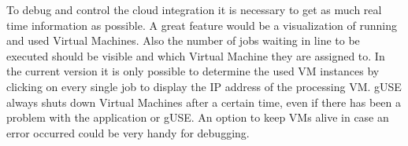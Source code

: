 To debug and control the cloud integration it is necessary to get as much real time information as possible.
A great feature would be a visualization of running and used Virtual Machines.
Also the number of jobs waiting in line to be executed should be visible and which Virtual Machine they are assigned to.
In the current version it is only possible to determine the used VM instances by clicking on every single job to display the IP address of the processing VM.
gUSE always shuts down Virtual Machines after a certain time, even if there has been a problem with the application or gUSE.
An option to keep VMs alive in case an error occurred could be very handy for debugging.